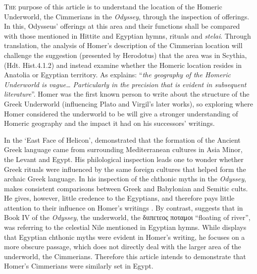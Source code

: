 	
\lettrine[nindent=0em,lines=3]{T}{he}  purpose of this article is to understand the location of the Homeric Underworld, the Cimmerians in the \emph{Odyssey}, through the inspection of offerings. In this, Odysseus’ offerings at this area and their functions shall be compared with those mentioned in Hittite and Egyptian hymns, rituals and \emph{stelai}. Through translation, the analysis of Homer’s description of the Cimmerian location will challenge the suggestion (presented by Herodotus) that the area was in Scythia, (Hdt. Hist.4.1.2) and instead examine whether the Homeric location resides in Anatolia or Egyptian territory. As \textcite[356]{Morford2011} explains: “\emph{the geography of the Homeric Underworld is vague… Particularly in the precision that is evident in subsequent literature}”. Homer was the first known person to write about the structure of the Greek Underworld (influencing Plato and Virgil’s later works), so exploring where Homer considered the underworld to be will give a stronger understanding of Homeric geography and the impact it had on his successors’ writings.
	
	In the ‘East Face of Helicon’, \textcite[12]{West1997} demonstrated that the formation of the Ancient Greek language came from surrounding Mediterranean cultures in Asia Minor, the Levant and Egypt. His philological inspection leads one to wonder whether Greek rituals were influenced by the same foreign cultures that helped form the archaic Greek language. In his inspection of the chthonic myths in the \emph{Odyssey}, \textcite[425]{West1997} makes consistent comparisons between Greek and Babylonian and Semitic cults. He gives, however, little credence to the Egyptians, and therefore pays little attention to their influence on Homer’s writings \parencite[12]{West1997}. By contrast, \textcite[353–362]{Griffith1997} suggests that in Book IV of the \emph{Odyssey}, the underworld, the διιπετεος ποταμοι “floating of river”, was referring to the celestial Nile mentioned in Egyptian hymns. While \textcite{Griffith1997} displays that Egyptian chthonic myths were evident in Homer’s writing, he focuses on a more obscure passage, which does not directly deal with the larger area of the underworld, the Cimmerians. Therefore this article intends to demonstrate that Homer’s Cimmerians were similarly set in Egypt.
	
	
